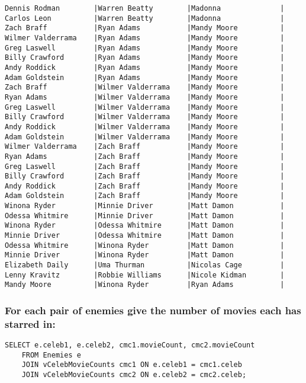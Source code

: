 \documentclass{article}
\begin{document}
\begin{verbatim}
Dennis Rodman        |Warren Beatty        |Madonna              |
Carlos Leon          |Warren Beatty        |Madonna              |
Zach Braff           |Ryan Adams           |Mandy Moore          |
Wilmer Valderrama    |Ryan Adams           |Mandy Moore          |
Greg Laswell         |Ryan Adams           |Mandy Moore          |
Billy Crawford       |Ryan Adams           |Mandy Moore          |
Andy Roddick         |Ryan Adams           |Mandy Moore          |
Adam Goldstein       |Ryan Adams           |Mandy Moore          |
Zach Braff           |Wilmer Valderrama    |Mandy Moore          |
Ryan Adams           |Wilmer Valderrama    |Mandy Moore          |
Greg Laswell         |Wilmer Valderrama    |Mandy Moore          |
Billy Crawford       |Wilmer Valderrama    |Mandy Moore          |
Andy Roddick         |Wilmer Valderrama    |Mandy Moore          |
Adam Goldstein       |Wilmer Valderrama    |Mandy Moore          |
Wilmer Valderrama    |Zach Braff           |Mandy Moore          |
Ryan Adams           |Zach Braff           |Mandy Moore          |
Greg Laswell         |Zach Braff           |Mandy Moore          |
Billy Crawford       |Zach Braff           |Mandy Moore          |
Andy Roddick         |Zach Braff           |Mandy Moore          |
Adam Goldstein       |Zach Braff           |Mandy Moore          |
Winona Ryder         |Minnie Driver        |Matt Damon           |
Odessa Whitmire      |Minnie Driver        |Matt Damon           |
Winona Ryder         |Odessa Whitmire      |Matt Damon           |
Minnie Driver        |Odessa Whitmire      |Matt Damon           |
Odessa Whitmire      |Winona Ryder         |Matt Damon           |
Minnie Driver        |Winona Ryder         |Matt Damon           |
Elizabeth Daily      |Uma Thurman          |Nicolas Cage         |
Lenny Kravitz        |Robbie Williams      |Nicole Kidman        |
Mandy Moore          |Winona Ryder         |Ryan Adams           |
        \end{verbatim}
        
        
        \subsubsection*{For each pair of enemies give the number of movies each has starred in:}
        \begin{verbatim}
SELECT e.celeb1, e.celeb2, cmc1.movieCount, cmc2.movieCount
    FROM Enemies e
    JOIN vCelebMovieCounts cmc1 ON e.celeb1 = cmc1.celeb
    JOIN vCelebMovieCounts cmc2 ON e.celeb2 = cmc2.celeb;\end{verbatim}
    
\end{document}
